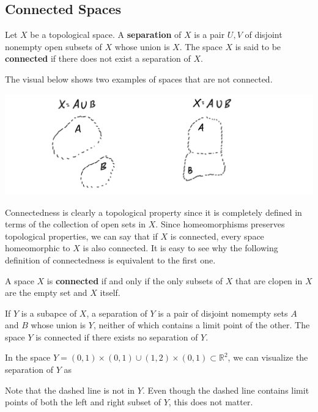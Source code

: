   \subsection{Connected Spaces}

    \begin{definition}
    Let $X$ be a topological space. A \textbf{separation} of $X$ is a pair $U, V$ of disjoint nonempty open subsets of $X$ whose union is $X$. The space $X$ is said to be \textbf{connected} if there does not exist a separation of $X$. 

    The visual below shows two examples of spaces that are not connected. 
    \begin{center}
        \includegraphics[scale=0.25]{img/Not_Connected_Spaces_Examples.PNG}
    \end{center}
    \end{definition}

    Connectedness is clearly a topological property since it is completely defined in terms of the collection of open sets in $X$. Since homeomorphisms preserves topological properties, we can say that if $X$ is connected, every space homeomorphic to $X$ is also connected. It is easy to see why the following definition of connectedness is equivalent to the first one. 

    \begin{definition}
    A space $X$ is \textbf{connected} if and only if the only subsets of $X$ that are clopen in $X$ are the empty set and $X$ itself. 
    \end{definition}

    \begin{lemma}
    If $Y$ is a subapce of $X$, a separation of $Y$ is a pair of disjoint nomempty sets $A$ and $B$ whose union is $Y$, neither of which contains a limit point of the other. The space $Y$ is connected if there exists no separation of $Y$. 
    \end{lemma}
    \begin{example}
    In the space $Y = (0,1) \times (0,1) \cup (1,2) \times (0,1) \subset \mathbb{R}^2$, we can visualize the separation of $Y$ as
    \begin{center}
    \end{center}
    Note that the dashed line is not in $Y$. Even though the dashed line contains limit points of both the left and right subset of $Y$, this does not matter. 
    \end{example}


